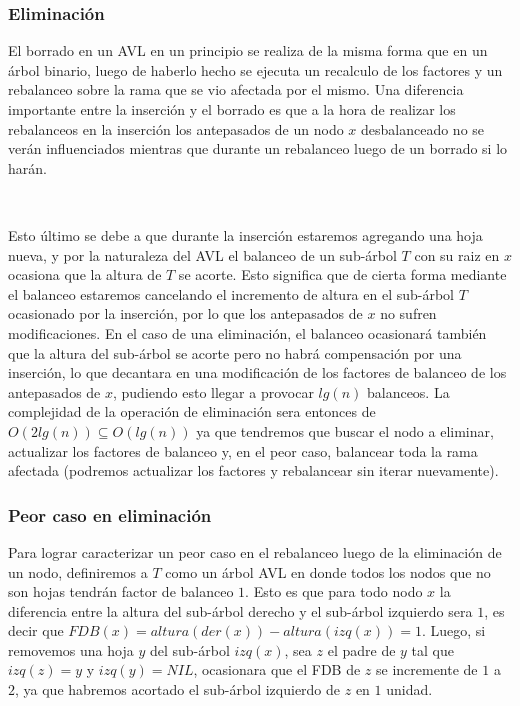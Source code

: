 \subsubsection{Eliminaci\'on}

El borrado en un AVL en un principio se realiza de la misma forma que en un \'arbol binario, luego de haberlo hecho se ejecuta un recalculo de los factores y un rebalanceo sobre la rama que se vio afectada por el mismo. Una diferencia importante entre la inserci\'on y el borrado es que a la hora de realizar los rebalanceos en la inserci\'on los antepasados de un nodo $x$ desbalanceado no se ver\'an influenciados mientras que durante un rebalanceo luego de un borrado si lo har\'an. 

~

Esto \'ultimo se debe a que durante la inserci\'on estaremos agregando una hoja nueva, y por la naturaleza del AVL el balanceo de un sub-\'arbol $T$ con su raiz en $x$ ocasiona que la altura de $T$ se acorte. Esto significa que de cierta forma mediante el balanceo estaremos cancelando el incremento de altura en el sub-\'arbol $T$ ocasionado por la inserci\'on, por lo que los antepasados de $x$ no sufren modificaciones. En el caso de una eliminaci\'on, el balanceo ocasionar\'a tambi\'en que la altura del sub-\'arbol se acorte pero no habr\'a compensaci\'on por una inserci\'on, lo que decantara en una modificaci\'on de los factores de balanceo de los antepasados de $x$, pudiendo esto llegar a provocar $lg(n)$ balanceos. La complejidad de la operaci\'on de eliminaci\'on sera entonces de $O(2lg(n)) \subseteq O(lg(n))$ ya que tendremos que buscar el nodo a eliminar, actualizar los factores de balanceo y, en el peor caso, balancear toda la rama afectada (podremos actualizar los factores y rebalancear sin iterar 
nuevamente).

\subsubsection{Peor caso en eliminaci\'on}

Para lograr caracterizar un peor caso en el rebalanceo luego de la eliminaci\'on de un nodo, definiremos a $T$ como un \'arbol AVL en donde todos los nodos que no son hojas tendr\'an factor de balanceo $1$. Esto es que para todo nodo $x$ la diferencia entre la altura del sub-\'arbol derecho y el sub-\'arbol izquierdo sera $1$, es decir que $FDB(x) = altura(der(x))-altura(izq(x)) = 1$. Luego, si removemos una hoja $y$ del sub-\'arbol $izq(x)$, sea $z$ el padre de $y$ tal que $izq(z)=y$ y $izq(y) = NIL$, ocasionara que el FDB de $z$ se incremente de $1$ a $2$, ya que habremos acortado el sub-\'arbol izquierdo de $z$ en $1$ unidad.

